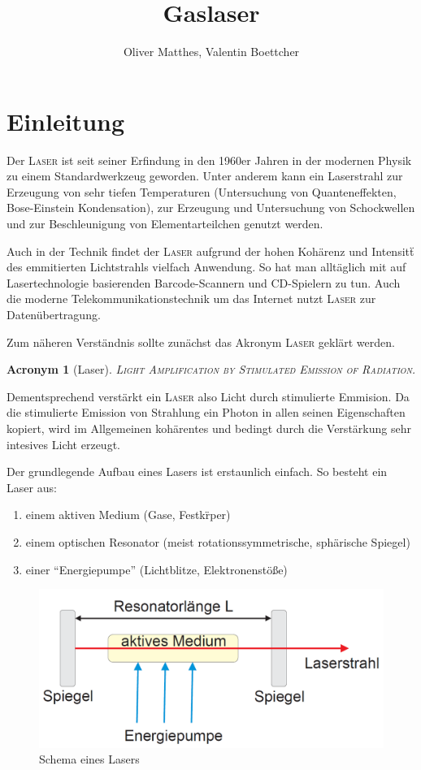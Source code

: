 \documentclass[slug=GL, room=HZDR\ Dresden/Rossendorf\,\ Geb.\ 620/123, supervisor=Tim\ Ziegler]{../../Lab_Report_LaTeX/lab_report}
\title{Gaslaser}
\author{Oliver Matthes, Valentin Boettcher}
\newcommand{\laser}{\textsc{Laser}}
\newtheorem{acro}{Acronym}[section]
\begin{document}
\maketitle

\section{Einleitung}%
\label{sec:intro}
Der \laser{} ist seit seiner Erfindung in den 1960er Jahren in der
modernen Physik zu einem Standardwerkzeug geworden. Unter anderem
kann ein Laserstrahl zur Erzeugung von sehr tiefen Temperaturen
(Untersuchung von Quanteneffekten, Bose-Einstein Kondensation), zur
Erzeugung und Untersuchung von Schockwellen und zur Beschleunigung von
Elementarteilchen genutzt werden.

Auch in der Technik findet der \laser{} aufgrund der hohen Koh\"arenz
und Intensit\"t des emmitierten Lichtstrahls vielfach Anwendung. So
hat man allt\"aglich mit auf Lasertechnologie basierenden
Barcode-Scannern und CD-Spielern zu tun. Auch die moderne
Telekommunikationstechnik um das Internet nutzt \laser{} zur
Daten\"ubertragung.

Zum n\"aheren Verst\"andnis sollte zun\"achst das Akronym \laser{}
gekl\"art werden.

\begin{acro}[Laser]
\textsc{Light Amplification by Stimulated Emission of Radiation.}
\end{acro}

Dementsprechend verst\"arkt ein \laser{} also Licht durch stimulierte
Emmision. Da die stimulierte Emission von Strahlung ein Photon in
allen seinen Eigenschaften kopiert, wird im Allgemeinen koh\"arentes
und bedingt durch die Verst\"arkung sehr intesives Licht erzeugt.

Der grundlegende Aufbau eines Lasers ist erstaunlich einfach. So
besteht ein Laser aus:

\begin{enumerate}
\item einem aktiven Medium (Gase, Festk\"rper)
\item einem optischen Resonator (meist rotationssymmetrische, sph\"arische Spiegel)
\item einer ``Energiepumpe'' (Lichtblitze, Elektronenst\"oße)
\end{enumerate}

\begin{figure}[H]\centering
  \includegraphics[width=.5\columnwidth]{schema.png}
  \caption[Aufbau]{Schema eines Lasers}
  \label{fig:aufb}
\end{figure}
\end{document}
